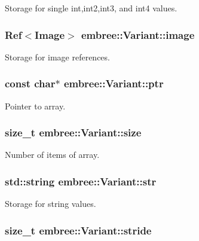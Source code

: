 Storage for single int,int2,int3, and int4 values. 

\hypertarget{structembree_1_1_variant_a2357d59f6f9492d26781a6a70a70d847}{
\subsubsection[{image}]{\setlength{\rightskip}{0pt plus 5cm}Ref$<$Image$>$ {\bf embree::Variant::image}}}
\label{structembree_1_1_variant_a2357d59f6f9492d26781a6a70a70d847}


Storage for image references. 

\hypertarget{structembree_1_1_variant_abee4587142dc55fee814fddb904bd88a}{
\subsubsection[{ptr}]{\setlength{\rightskip}{0pt plus 5cm}const char$\ast$ {\bf embree::Variant::ptr}}}
\label{structembree_1_1_variant_abee4587142dc55fee814fddb904bd88a}


Pointer to array. 

\hypertarget{structembree_1_1_variant_a8e91a7eeadcecfa5e907ee8427a777e6}{
\subsubsection[{size}]{\setlength{\rightskip}{0pt plus 5cm}size\_\-t {\bf embree::Variant::size}}}
\label{structembree_1_1_variant_a8e91a7eeadcecfa5e907ee8427a777e6}


Number of items of array. 

\hypertarget{structembree_1_1_variant_ae4163ae1235b6a41f2db49c2de56796e}{
\subsubsection[{str}]{\setlength{\rightskip}{0pt plus 5cm}std::string {\bf embree::Variant::str}}}
\label{structembree_1_1_variant_ae4163ae1235b6a41f2db49c2de56796e}


Storage for string values. 

\hypertarget{structembree_1_1_variant_a3c6661cb3c0aa893fe61c3832862e46e}{
\subsubsection[{stride}]{\setlength{\rightskip}{0pt plus 5cm}size\_\-t {\bf embree::Variant::stride}}}
\label{structembree_1_1_variant_a3c6661cb3c0aa893fe61c3832862e46e}


